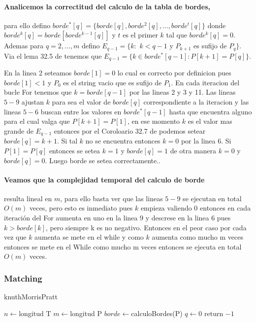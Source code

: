 	\paragraph{Analicemos la correctitud del calculo de la tabla de bordes,} 
		para ello defino $borde^*[q] = \{borde[q],borde^2[q],\dots , borde^t[q]\}$ 
		donde $borde^k[q] = borde[borde^{k-1}[q]]$ y $t$ es el primer
		$k$ tal que $borde^k[q]=0$. Ademas para $q=2,\dots ,m$ defino
		$E_{q-1}=\{k:$ $k<q-1$ y $P_{k+1}$ es sufijo de $P_q  \}$. Via el
		lema 32.5 de \cite{cormen} tenemos que $E_{q-1}=\{k\in borde^*[q-1]:P[k+1]=P[q]\}$.
		
		
		En la linea 2 seteamos $borde[1]=0$ lo cual es correcto por 
		definicion pues $borde[1]<1$ y $P_0$ es el string vacio que
		es sufijo de $P_1$. En cada iteracion del bucle For tenemos que
		$k=borde[q-1]$ por las lineas 2 y 3 y 11. Las lineas $5-9$ ajustan
		$k$ para sea el valor de $borde[q]$ correspondiente a la iteracion
		y las lineas $5-6$ buscan entre los valores en $borde^*[q-1]$ hasta
		que encuentra alguno para el cual valga que $P[k+1]=P[1]$, en ese
		momento $k$ es el valor mas grande de $E_{q-1}$ entonces por el
		Coroloario 32.7 de \cite{cormen} podemos setear $borde[q]=k+1$. Si tal
		$k$ no se encuentra entonces $k=0$ por la linea $6$. Si $P[1]=P[q]$ entonces
		se setea $k=1$ y $borde[q]=1$ de otra manera $k=0$ y $borde[q]=0$. Luego
		borde se setea correctamente..
		
	\paragraph{Veamos que la complejidad temporal del calculo de borde}
		resulta lineal en $m$, para ello basta ver
		que las lineas $5-9$ se ejecutan en total $O(m)$ veces, pero esto
		es inmediato pues $k$ empieza valiendo 0 entonces en cada iteraci\'on
		del For aumenta en uno en la linea 9 y descrese en la linea 6 pues $k>borde[k]$,
		pero siempre k es no negativo.
		Entonces en el peor caso por cada vez que $k$ aumenta se mete en el while
		y como $k$ aumenta como mucho m veces entonces se mete en el While
		como mucho m veces entonces se ejecuta en total $O(m)$ veces.
	
	
	\subsubsection{Matching}
	\begin{algorithm}[h]
	\caption{knuthMorrisPratt}
	\BlankLine
			$n\leftarrow$longitud T\;
			$m\leftarrow$longitud P\;
			$borde\leftarrow$calculoBordes(P)\;
			$q\leftarrow 0$\;
			return $-1$ \;
	\end{algorithm}
	

